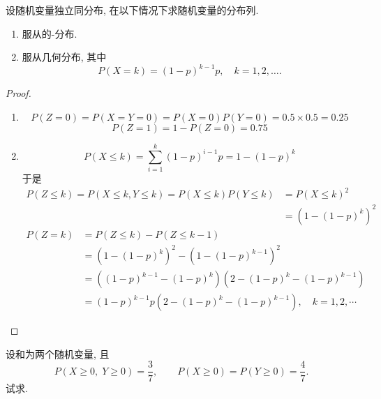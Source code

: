 \documentclass[../main.tex]{subfiles}
\begin{document}
\begin{exercise}{}{}
设随机变量独立同分布, 在以下情况下求随机变量的分布列.
\begin{enumerate}
\item
{}服从的-分布.

\item
{}服从几何分布, 其中
\[
P(X=k)=(1-p)^{k-1}p,\quad k=1,2,\dots.
\]
\end{enumerate}
\end{exercise}
\begin{proof}
    \begin{enumerate}
        \item  \[
        P\left( Z= 0 \right)= P\left( X= Y= 0 \right)= P\left( X= 0 \right)P\left( Y= 0 \right)= 0.5\times 0.5= 0.25    
        \] \[
        P\left( Z= 1 \right)= 1-P\left( Z= 0 \right)= 0.75  
        \]
        \item  \[
        P\left( X\le k \right)= \sum _{i= 1}^{k}\left( 1-p \right)^{i-1}p= 1- \left( 1-p \right)^{k}   
        \] 于是 \[
        \begin{aligned}
        P\left( Z\le k \right)= P\left( X\le k,Y\le k \right)= P\left( X\le k \right)P\left( Y\le k \right)&= P\left( X\le k \right)^{2}\\ 
         &= \left( 1-\left( 1-p \right)^{k}  \right)^{2}       
        \end{aligned}
        \] \[
      \begin{aligned}
        P\left( Z= k \right)&= P\left( Z\le k \right)-P\left( Z\le k-1 \right)\\ 
         &=    \left( 1-\left( 1-p \right)^{k}  \right)^{2}-\left( 1-\left( 1-p \right)^{k-1}  \right) ^{2}  \\ 
          &= \left( \left( 1-p \right)^{k-1}-\left( 1-p \right)^{k}   \right)\left( 2- \left( 1-p \right)^{k}-\left( 1-p \right)^{k-1}   \right)\\ 
           &= \left( 1-p \right)^{k-1}p \left( 2-\left( 1-p \right)^{k}-\left( 1-p \right)^{k-1}  \right)    ,\quad k= 1,2,\cdots 
      \end{aligned}
        \]
    \end{enumerate}
    
\end{proof}
\begin{exercise}{}{}
设和为两个随机变量, 且
\[
P(X\ge0,\;Y\ge0)=\frac{3}{7},\qquad
P(X\ge0)=P(Y\ge0)=\frac{4}{7}.
\]
试求.
\end{exercise}
\end{document}
